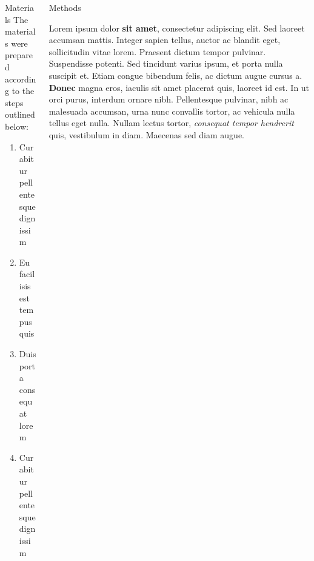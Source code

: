 \documentclass[]{beamer}
\begin{document}
\begin{frame}[t]
\begin{columns}[t]
\begin{column}{\twocolwid}
\begin{columns}[t,totalwidth=\twocolwid]
\begin{column}{\onecolwid}
\begin{block}{Materials}
    The materials were prepared according to the steps outlined below:
    
    \begin{enumerate}
    \item Curabitur pellentesque dignissim
    \item Eu facilisis est tempus quis
    \item Duis porta consequat lorem
    \item Curabitur pellentesque dignissim
    \end{enumerate}
    
    \end{block}
    
    
    \end{column} %
    
    \begin{column}{\onecolwid}\vspace{-.6in} %
    
    
    \begin{block}{Methods}
    
    Lorem ipsum dolor \textbf{sit amet}, consectetur adipiscing elit. Sed laoreet accumsan mattis. Integer sapien tellus, auctor ac blandit eget, sollicitudin vitae lorem. Praesent dictum tempor pulvinar. Suspendisse potenti. Sed tincidunt varius ipsum, et porta nulla suscipit et. Etiam congue bibendum felis, ac dictum augue cursus a. \textbf{Donec} magna eros, iaculis sit amet placerat quis, laoreet id est. In ut orci purus, interdum ornare nibh. Pellentesque pulvinar, nibh ac malesuada accumsan, urna nunc convallis tortor, ac vehicula nulla tellus eget nulla. Nullam lectus tortor, \textit{consequat tempor hendrerit} quis, vestibulum in diam. Maecenas sed diam augue.
    
    \end{block}
    
    
    \end{column} %
    

\end{columns}
\end{column}
\end{columns}
\end{frame}
\end{document}
